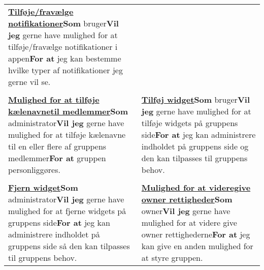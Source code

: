\begin{tabular}{p{2.5in}p{2.5in}}
\textbf{\underline{Tilføje/fravælge notifikationer}}\newline \textbf{Som} bruger\newline \textbf{Vil jeg} gerne have mulighed for at tilføje/fravælge notifikationer i appen\newline \textbf{For at} jeg kan bestemme hvilke typer af notifikationer jeg gerne vil se.  \\\\

\textbf{\underline{Mulighed for at tilføje kælenavne}}\newline \textbf{\underline{til medlemmer}}\newline \textbf{Som} administrator\newline \textbf{Vil jeg} gerne have mulighed for at tilføje kælenavne til en eller flere af gruppens medlemmer\newline \textbf{For at} gruppen personliggøres.  &

\textbf{\underline{Tilføj widget}}\newline \textbf{Som} bruger\newline \textbf{Vil jeg} gerne have mulighed for at tilføje widgets på gruppens side\newline \textbf{For at} jeg kan administrere indholdet på gruppens side og den kan tilpasses til gruppens behov.  \\\\

\textbf{\underline{Fjern widget}}\newline \textbf{Som} administrator\newline \textbf{Vil jeg} gerne have mulighed for at fjerne widgets på gruppens side\newline \textbf{For at} jeg kan administrere indholdet på gruppens side så den kan tilpasses til gruppens behov. &

\textbf{\underline{Mulighed for at videregive owner rettigheder}}\newline \textbf{Som} owner\newline \textbf{Vil jeg} gerne have mulighed for at videre give owner rettighederne\newline \textbf{For at} jeg kan give en anden mulighed for at styre gruppen.

\end{tabular}






